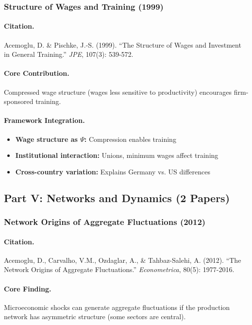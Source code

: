 \documentclass[12pt,a4paper]{article}
\begin{document}
\subsubsection{Structure of Wages and Training (1999)}

\paragraph{Citation.}
Acemoglu, D. \& Pischke, J.-S. (1999).
``The Structure of Wages and Investment in General Training.''
\emph{JPE}, 107(3): 539-572.

\paragraph{Core Contribution.}
Compressed wage structure (wages less sensitive to productivity)
encourages firm-sponsored training.

\paragraph{Framework Integration.}
\begin{itemize}
  \item \textbf{Wage structure as $\Psi$:} Compression enables training
  \item \textbf{Institutional interaction:} Unions, minimum wages affect training
  \item \textbf{Cross-country variation:} Explains Germany vs. US differences
\end{itemize}

\subsection{Part V: Networks and Dynamics (2 Papers)}

\subsubsection{Network Origins of Aggregate Fluctuations (2012)}

\paragraph{Citation.}
Acemoglu, D., Carvalho, V.M., Ozdaglar, A., \& Tahbaz-Salehi, A. (2012).
``The Network Origins of Aggregate Fluctuations.'' \emph{Econometrica}, 80(5): 1977-2016.

\paragraph{Core Finding.}
Microeconomic shocks can generate aggregate fluctuations if the production
network has asymmetric structure (some sectors are central).
\end{document}
